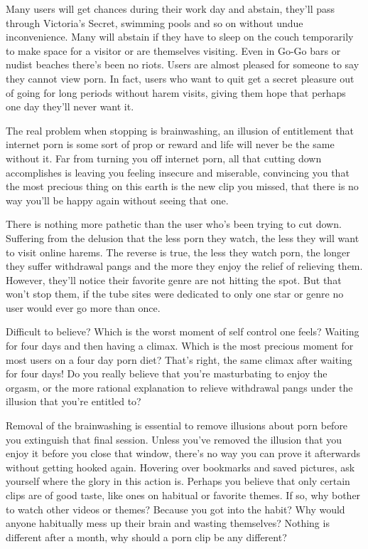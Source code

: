 \documentclass[easypeasy.tex]{subfiles}
\begin{document}
Many users will get chances during their work day and abstain, they'll pass through Victoria's Secret, swimming pools and so on without undue inconvenience. Many will abstain if they have to sleep on the couch temporarily to make space for a visitor or are themselves visiting. Even in Go-Go bars or nudist beaches there's been no riots. Users are almost pleased for someone to say they cannot view porn. In fact, users who want to quit get a secret pleasure out of going for long periods without harem visits, giving them hope that perhaps one day they'll never want it.

The real problem when stopping is brainwashing, an illusion of entitlement that internet porn is some sort of prop or reward and life will never be the same without it. Far from turning you off internet porn, all that cutting down accomplishes is leaving you feeling insecure and miserable, convincing you that the most precious thing on this earth is the new clip you missed, that there is no way you'll be happy again without seeing that one.

There is nothing more pathetic than the user who's been trying to cut down. Suffering from the delusion that the less porn they watch, the less they will want to visit online harems. The reverse is true, the less they watch porn, the longer they suffer withdrawal pangs and the more they enjoy the relief of relieving them. However, they'll notice their favorite genre are not hitting the spot. But that won't stop them, if the tube sites were dedicated to only one star or genre no user would ever go more than once.

Difficult to believe? Which is the worst moment of self control one feels? Waiting for four days and then having a climax. Which is the most precious moment for most users on a four day porn diet? That's right, the same climax after waiting for four days! Do you really believe that you're masturbating to enjoy the orgasm, or the more rational explanation to relieve withdrawal pangs under the illusion that you're entitled to?

Removal of the brainwashing is essential to remove illusions about porn before you extinguish that final session. Unless you've removed the illusion that you enjoy it before you close that window, there's no way you can prove it afterwards without getting hooked again. Hovering over bookmarks and saved pictures, ask yourself where the glory in this action is. Perhaps you believe that only certain clips are of good taste, like ones on habitual or favorite themes. If so, why bother to watch other videos or themes? Because you got into the habit? Why would anyone habitually mess up their brain and wasting themselves? Nothing is different after a month, why should a porn clip be any different?
\end{document}
